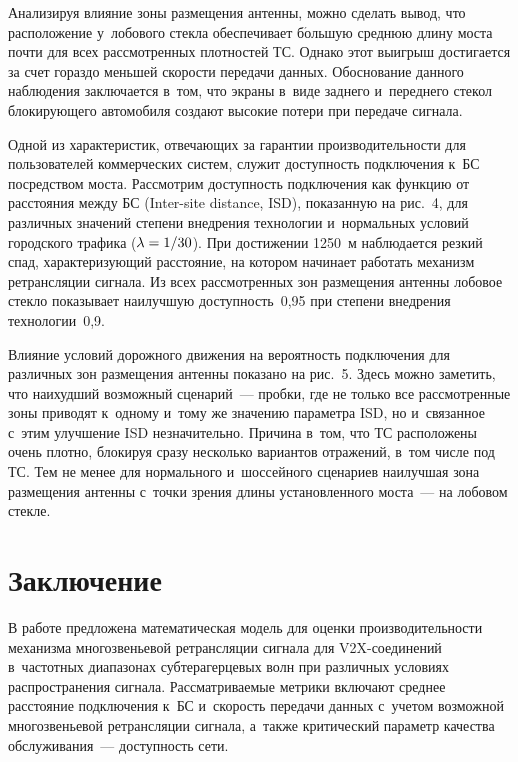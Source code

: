 \begin{multicols}{2}
     Анализируя влияние зоны размещения антенны, можно сделать вывод, 
что расположение у~лобового стекла обеспечивает 
б$\acute{\mbox{о}}$льшую сред\-нюю длину мос\-та почти для всех 
рассмотренных плотностей ТС. Однако этот выигрыш достигается за счет 
гораздо меньшей ско\-рости передачи данных. Обоснование данного 
наблюдения заключается в~том, что экраны в~виде заднего и~переднего стекол 
блокирующего автомобиля создают высокие потери при передаче сигнала.
     
     Одной из характеристик, отвечающих за гарантии производительности 
для пользователей коммерческих систем, служит до\-ступ\-ность подключения 
к~БС посредством моста. Рас\-смот\-рим \mbox{до\-ступ\-ность} подключения как 
функцию от рас\-сто\-яния между БС (Inter-site distance, ISD), показанную на 
рис.~4, для различных значений степени внед\-ре\-ния технологии 
и~нормальных условий городского трафика ($\lambda\hm= 1/30$). При 
достижении 1250~м наблюдается резкий спад, ха\-рак\-те\-ри\-зу\-ющий расстояние, 
на котором начинает работать механизм ре\-транс\-ля\-ции сигнала. Из всех 
рас\-смот\-рен\-ных зон размещения антенны лобовое стек\-ло показывает 
наилучшую до\-ступ\-ность~0,95 при степени внед\-ре\-ния технологии~0,9.
     
     Влияние условий дорожного движения на ве\-ро\-ят\-ность подключения 
для различных зон размещения антенны показано на рис.~5. Здесь 
можно заметить, что наихудший возможный сценарий~--- пробки, где не 
только все рас\-смот\-рен\-ные зоны приводят к~одному и~тому же значению 
параметра ISD, но и~связанное с~этим улучшение ISD незначительно. 
Причина в~том, что ТС расположены очень плот\-но, блокируя сразу несколько 
вариантов отражений, в~том чис\-ле под ТС. Тем не менее для нормального 
и~шоссейного сценариев наилучшая зона размещения антенны с~точ\-ки 
зрения длины установленного мос\-та~--- на лобовом стекле.

  
      

  
\section{Заключение}

     В работе предложена математическая модель для оценки 
производительности механизма мно\-го\-звень\-евой ретрансляции сигнала для 
V2X-со\-еди\-не\-ний в~частотных диапазонах субтерагерцевых волн при 
различных условиях распространения сигнала. Рассматриваемые метрики 
включают среднее расстояние подключения к~БС и~скорость передачи 
данных с~учетом возможной многозвеньевой ретрансляции сигнала, а~также 
критический параметр качества обслуживания~--- доступность сети.
     

\end{multicols}
